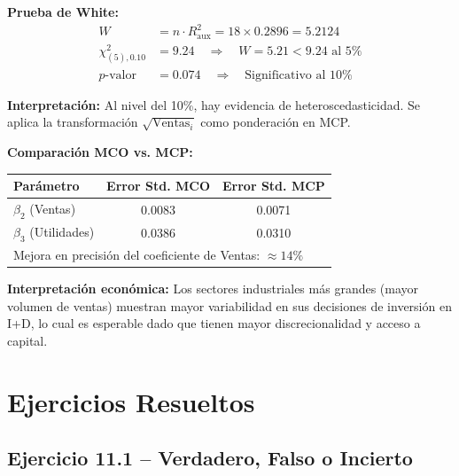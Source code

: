 \documentclass[12pt,a4paper]{report}
\theoremstyle{definition}
\theoremstyle{remark}
\begin{document}
\begin{tcolorbox}[ejemplostyle, title={Resultados: Prueba de White y Corrección MCP}]
  \textbf{Prueba de White:}
  \begin{align*}
    W &= n \cdot R^2_{\text{aux}} = 18 \times 0.2896 = 5.2124 \\
    \chi^2_{(5), 0.10} &= 9.24 \quad \Rightarrow \quad W = 5.21 < 9.24 \text{ al 5\%}\\
    p\text{-valor} &= 0.074 \quad \Rightarrow \quad \text{Significativo al 10\%}
  \end{align*}

  \textbf{Interpretación:} Al nivel del 10\%, hay evidencia de heteroscedasticidad. Se aplica la transformación $\sqrt{\text{Ventas}_i}$ como ponderación en MCP.

  \textbf{Comparación MCO vs. MCP:}
  \begin{center}
  \begin{tabular}{lcc}
    \toprule
    \textbf{Parámetro} & \textbf{Error Std. MCO} & \textbf{Error Std. MCP} \\
    \midrule
    $\beta_2$ (Ventas) & 0.0083 & 0.0071 \\
    $\beta_3$ (Utilidades) & 0.0386 & 0.0310 \\
    \bottomrule
    \multicolumn{3}{l}{\small Mejora en precisión del coeficiente de Ventas: $\approx 14\%$}\\
  \end{tabular}
  \end{center}

  \textbf{Interpretación económica:} Los sectores industriales más grandes (mayor volumen de ventas) muestran mayor variabilidad en sus decisiones de inversión en I+D, lo cual es esperable dado que tienen mayor discrecionalidad y acceso a capital.
\end{tcolorbox}

\section{Ejercicios Resueltos}

\subsection{Ejercicio 11.1 -- Verdadero, Falso o Incierto}
\end{document}
